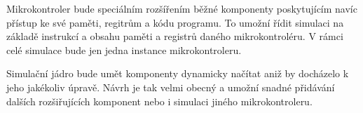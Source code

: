 Mikrokontroler bude speciálním rozšířením běžné komponenty poskytujícím navíc přístup ke své paměti, regitrům a kódu programu. To umožní řídit simulaci na základě instrukcí a obsahu paměti a registrů daného mikrokontroléru. V rámci celé simulace bude jen jedna instance mikrokontroleru.

Simulační jádro bude umět komponenty dynamicky načítat aniž by docházelo k jeho jakékoliv úpravě. Návrh je tak velmi obecný a umožní snadné přidávání dalších rozšiřujících komponent nebo i simulaci jiného mikrokontroleru.

% 
% 
% 
% 
% 
% 
% 

